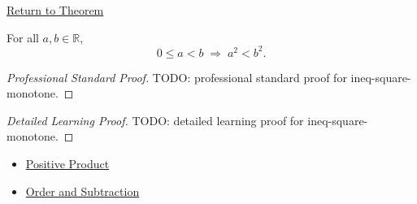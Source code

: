 \newpage
{}
\label{prf:ineq-square-monotone}

\begin{remark*}[Return]
\hyperref[thm:ineq-square-monotone]{Return to Theorem}
\end{remark*}

\begin{theorem*}
For all $a, b \in \mathbb{R}$,
\[
  0 \le a < b \;\Rightarrow\; a^2 < b^2.
\]
\end{theorem*}

\begin{proof}[Professional Standard Proof]
\LRAProofBodyStart
TODO: professional standard proof for ineq-square-monotone.
\end{proof}

\begin{proof}[Detailed Learning Proof]
\LRAProofBodyStart
TODO: detailed learning proof for ineq-square-monotone.
\end{proof}

\begin{remark*}
\end{remark*}

\begin{dependencies}
\begin{itemize}
  \item \hyperref[lem:positive-product]{Positive Product}
  \item \hyperref[lem:order-and-subtraction]{Order and Subtraction}
\end{itemize}
\end{dependencies}

\clearpage
